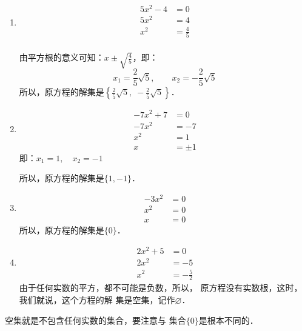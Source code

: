 \begin{solution}
\begin{enumerate}
    \item 
    \begin{align*}
        5x^2-4&=0\\
        5x^2&=4\tag{移项}\\
        x^2&=\frac{4}{5} \tag{两边除以5}\\
    \end{align*}

    由平方根的意义可知：$x\pm\sqrt{\frac{4}{5}}$，即：
\[ x_1=\frac{2}{5}\sqrt{5},\qquad x_2=-\frac{2}{5}\sqrt{5} \]
所以，原方程的解集是$\left\{\frac{2}{5}\sqrt{5},\; -\frac{2}{5}\sqrt{5}\right\}$．

\item \begin{align*}
    -7x^2+7&=0\\
    -7x^2&=-7\tag{移项变号}\\
    x^2&=1\tag{两边除以$-7$}\\
    x&=\pm 1 \tag{平方根的意义}
\end{align*}
即：$x_1=1,\quad x_2=-1$

所以，原方程的解集是$\{1,-1\}$．

\item \begin{align*}
    -3x^2&=0\\
    x^2&=0 \tag{两边除以$-3$}\\
    x&=0
\end{align*}
所以，原方程的解集是$\{0\}$．

\item \begin{align*}
    2x^2+5&=0\\
2x^2&=-5  \tag{移项变号}\\
x^2&=-\frac{5}{2} \tag{两边除以2}
\end{align*}
由于任何实数的平方，都不可能是负数，所以，
原方程没有实数根，这时，我们就说，这个方程的解
集是空集，记作$\varnothing$．
\end{enumerate}
\end{solution}

\begin{rmk}
    空集就是不包含任何实数的集合，要注意与
集合$\{0\}$是根本不同的．
\end{rmk}

